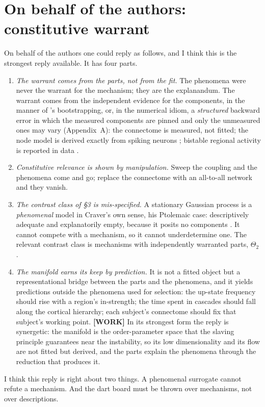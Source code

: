 \documentclass[11pt]{article}
\newcommand{\WORK}[1]{\textcolor{orange!85!red}{\textbf{[WORK]} #1}}
\begin{document}
\section{On behalf of the authors: constitutive warrant}
On behalf of the authors one could reply as follows, and I think this is the strongest reply available. It has four parts.
\begin{enumerate}
\item[R1] \emph{The warrant comes from the parts, not from the fit.} The phenomena were never the warrant for the mechanism; they are the explanandum. The warrant comes from the independent evidence for the components, in the manner of \textcite{glymour1980}'s bootstrapping, or, in the numerical idiom, a \emph{structured} backward error in which the measured components are pinned and only the unmeasured ones may vary (Appendix~A): the connectome is measured, not fitted; the node model is derived exactly from spiking neurons \parencite{montbrio2015}; bistable regional activity is reported in data \parencite[refs 39--41 therein]{fousek2024}.
\item[R2] \emph{Constitutive relevance is shown by manipulation.} Sweep the coupling and the phenomena come and go; replace the connectome with an all-to-all network and they vanish.
\item[R3] \emph{The contrast class of \S3 is mis-specified.} A stationary Gaussian process is a \emph{phenomenal} model in Craver's own sense, his Ptolemaic case: descriptively adequate and explanatorily empty, because it posits no components \parencite{craver2006}. It cannot compete with a mechanism, so it cannot underdetermine one. The relevant contrast class is mechanisms with independently warranted parts, $\Theta_2$.
\item[R4] \emph{The manifold earns its keep by prediction.} It is not a fitted object but a representational bridge between the parts and the phenomena, and it yields predictions outside the phenomena used for selection: the up-state frequency should rise with a region's in-strength; the time spent in cascades should fall along the cortical hierarchy; each subject's connectome should fix that subject's working point. \WORK{In its strongest form the reply is synergetic: the manifold is the order-parameter space that the slaving principle guarantees near the instability, so its low dimensionality and its flow are not fitted but derived, and the parts explain the phenomena through the reduction that produces it.}
\end{enumerate}
I think this reply is right about two things. A phenomenal surrogate cannot refute a mechanism. And the dart board must be thrown over mechanisms, not over descriptions.
\end{document}
